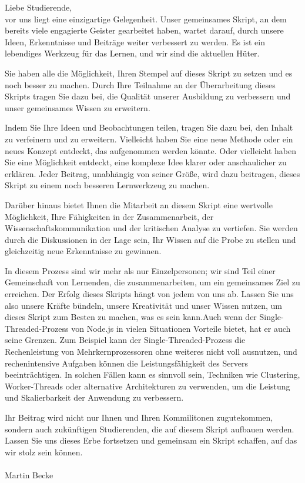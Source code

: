 \documentclass[a4paper,10pt]{book}
\begin{document}
Liebe Studierende,\\ vor uns liegt eine einzigartige Gelegenheit. Unser gemeinsames Skript, an dem bereits viele engagierte Geister gearbeitet haben, wartet darauf, durch unsere Ideen, Erkenntnisse und Beiträge weiter verbessert zu werden. Es ist ein lebendiges Werkzeug für das Lernen, und wir sind die aktuellen Hüter.

Sie haben alle die Möglichkeit, Ihren Stempel auf dieses Skript zu setzen und es noch besser zu machen. Durch Ihre Teilnahme an der Überarbeitung dieses Skripts tragen Sie dazu bei, die Qualität unserer Ausbildung zu verbessern und unser gemeinsames Wissen zu erweitern.

Indem Sie Ihre Ideen und Beobachtungen teilen, tragen Sie dazu bei, den Inhalt zu verfeinern und zu erweitern. Vielleicht haben Sie eine neue Methode oder ein neues Konzept entdeckt, das aufgenommen werden könnte. Oder vielleicht haben Sie eine Möglichkeit entdeckt, eine komplexe Idee klarer oder anschaulicher zu erklären. Jeder Beitrag, unabhängig von seiner Größe, wird dazu beitragen, dieses Skript zu einem noch besseren Lernwerkzeug zu machen.

Darüber hinaus bietet Ihnen die Mitarbeit an diesem Skript eine wertvolle Möglichkeit, Ihre Fähigkeiten in der Zusammenarbeit, der Wissenschaftskommunikation und der kritischen Analyse zu vertiefen. Sie werden durch die Diskussionen in der Lage sein, Ihr Wissen auf die Probe zu stellen und gleichzeitig neue Erkenntnisse zu gewinnen.

In diesem Prozess sind wir mehr als nur Einzelpersonen; wir sind Teil einer Gemeinschaft von Lernenden, die zusammenarbeiten, um ein gemeinsames Ziel zu erreichen. Der Erfolg dieses Skripts hängt von jedem von uns ab. Lassen Sie uns also unsere Kräfte bündeln, unsere Kreativität und unser Wissen nutzen, um dieses Skript zum Besten zu machen, was es sein kann.Auch wenn der Single-Threaded-Prozess von Node.js in vielen Situationen Vorteile bietet, hat er auch seine Grenzen. Zum Beispiel kann der Single-Threaded-Prozess die Rechenleistung von Mehrkernprozessoren ohne weiteres nicht voll ausnutzen, und rechenintensive Aufgaben können die Leistungsfähigkeit des Servers beeinträchtigen. In solchen Fällen kann es sinnvoll sein, Techniken wie Clustering, Worker-Threads oder alternative Architekturen zu verwenden, um die Leistung und Skalierbarkeit der Anwendung zu verbessern.

Ihr Beitrag wird nicht nur Ihnen und Ihren Kommilitonen zugutekommen, sondern auch zukünftigen Studierenden, die auf diesem Skript aufbauen werden. Lassen Sie uns dieses Erbe fortsetzen und gemeinsam ein Skript schaffen, auf das wir stolz sein können.
\\\\
Martin Becke
\newpage
\end{document}
